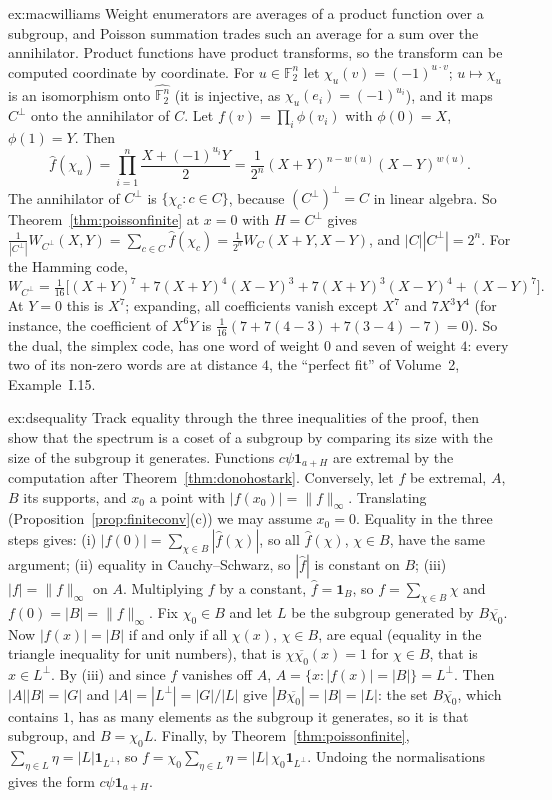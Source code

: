 \begin{solution}{ex:macwilliams}
\idea Weight enumerators are averages of a product function over a subgroup, and Poisson summation trades such an average for a
sum over the annihilator. Product functions have product transforms, so the transform can be computed coordinate by coordinate.
\writeup For $u\in\mathbb F_2^n$ let $\chi_u(v)=(-1)^{u\cdot v}$; $u\mapsto\chi_u$ is an isomorphism onto $\widehat{\mathbb F_2^n}$ (it is injective, as $\chi_u(e_i)=(-1)^{u_i}$), and it maps
$C^\perp$ onto the annihilator of $C$. Let $f(v)=\prod_i\phi(v_i)$ with $\phi(0)=X$, $\phi(1)=Y$. Then
\[\hat f(\chi_u)=\prod_{i=1}^n\frac{X+(-1)^{u_i}Y}2=\frac1{2^n}(X+Y)^{n-w(u)}(X-Y)^{w(u)}.\]
The annihilator of $C^\perp$ is $\{\chi_c:c\in C\}$, because $(C^\perp)^\perp=C$ in linear algebra. So Theorem~\ref{thm:poissonfinite} at $x=0$ with $H=C^\perp$ gives
$\frac1{|C^\perp|}W_{C^\perp}(X,Y)=\sum_{c\in C}\hat f(\chi_c)=\frac1{2^n}W_C(X+Y,X-Y)$, and $|C||C^\perp|=2^n$. For the Hamming code,
\[W_{C^\perp}=\tfrac1{16}\bigl[(X+Y)^7+7(X+Y)^4(X-Y)^3+7(X+Y)^3(X-Y)^4+(X-Y)^7\bigr].\]
At $Y=0$ this is $X^7$; expanding, all coefficients vanish except $X^7$ and $7X^3Y^4$ (for instance, the coefficient of $X^6Y$ is
$\frac1{16}(7+7(4-3)+7(3-4)-7)=0$). So the dual, the simplex code, has one word of weight $0$ and seven of weight $4$: every two of its
non-zero words are at distance $4$, the ``perfect fit'' of Volume~2, Example~I.15.
\end{solution}

\begin{solution}{ex:dsequality}
\idea Track equality through the three inequalities of the proof, then show that the spectrum is a coset of a subgroup by comparing
its size with the size of the subgroup it generates.
\writeup Functions $c\psi\mathbf 1_{a+H}$ are extremal by the computation after Theorem~\ref{thm:donohostark}. Conversely, let $f$ be extremal, $A$, $B$ its supports,
and $x_0$ a point with $|f(x_0)|=\|f\|_\infty$. Translating (Proposition~\ref{prop:finiteconv}(c)) we may assume $x_0=0$. Equality in the three steps gives: (i)
$|f(0)|=\sum_{\chi\in B}|\hat f(\chi)|$, so all $\hat f(\chi)$, $\chi\in B$, have the same argument; (ii) equality in Cauchy--Schwarz, so $|\hat f|$ is constant on
$B$; (iii) $|f|=\|f\|_\infty$ on $A$. Multiplying $f$ by a constant, $\hat f=\mathbf 1_B$, so $f=\sum_{\chi\in B}\chi$ and $f(0)=|B|=\|f\|_\infty$. Fix $\chi_0\in B$ and let $L$ be the
subgroup generated by $B\overline{\chi_0}$. Now $|f(x)|=|B|$ if and only if all $\chi(x)$, $\chi\in B$, are equal (equality in the triangle inequality for unit
numbers), that is $\chi\overline{\chi_0}(x)=1$ for $\chi\in B$, that is $x\in L^\perp$. By (iii) and since $f$ vanishes off $A$, $A=\{x:|f(x)|=|B|\}=L^\perp$. Then
$|A||B|=|G|$ and $|A|=|L^\perp|=|G|/|L|$ give $|B\overline{\chi_0}|=|B|=|L|$: the set $B\overline{\chi_0}$, which contains $1$, has as many elements as the subgroup it
generates, so it is that subgroup, and $B=\chi_0L$. Finally, by Theorem~\ref{thm:poissonfinite}, $\sum_{\eta\in L}\eta=|L|\mathbf 1_{L^\perp}$, so
$f=\chi_0\sum_{\eta\in L}\eta=|L|\,\chi_0\mathbf 1_{L^\perp}$. Undoing the normalisations gives the form $c\psi\mathbf 1_{a+H}$.
\end{solution}

